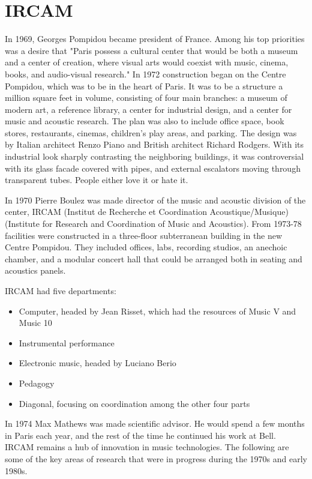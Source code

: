 \section{IRCAM}
In 1969, Georges Pompidou became president of France. Among his top priorities was a desire that "Paris possess a cultural center that would be both a museum and a center of creation, where visual arts would coexist with music, cinema, books, and audio-visual research."
In 1972 construction began on the Centre Pompidou, which was to be in the heart of Paris. It was to be a structure a million square feet in volume, consisting of four main branches: a museum of modern art, a reference library, a center for industrial design, and a center for music and acoustic research. The plan was also to include office space, book stores, restaurants, cinemas, children's play areas, and parking. The design was by Italian architect Renzo Piano and British architect Richard Rodgers. With its industrial look sharply contrasting the neighboring buildings, it was controversial with its glass facade covered with pipes, and external escalators moving through transparent tubes. People either love it or hate it.

In 1970 Pierre Boulez was made director of the music and acoustic division of the center, IRCAM (Institut de Recherche et Coordination Acoustique/Musique) (Institute for Research and Coordination of Music and Acoustics).
From 1973-78 facilities were constructed in a three-floor subterranean building in the new Centre Pompidou. They included offices, labs, recording studios, an anechoic chamber, and a modular concert hall that could be arranged both in seating and acoustics panels.

IRCAM had five departments:
\begin{itemize}
\item Computer, headed by Jean Risset, which had the resources of Music V and Music 10
\item Instrumental performance
\item Electronic music, headed by Luciano Berio
\item Pedagogy
\item Diagonal, focusing on coordination among the other four parts
\end{itemize}

In 1974 Max Mathews was made scientific advisor. He would spend a few months in Paris each year, and the rest of the time he continued his work at Bell. IRCAM remains a hub of innovation in music technologies. The following are some of the key areas of research that were in progress during the 1970s and early 1980s.

